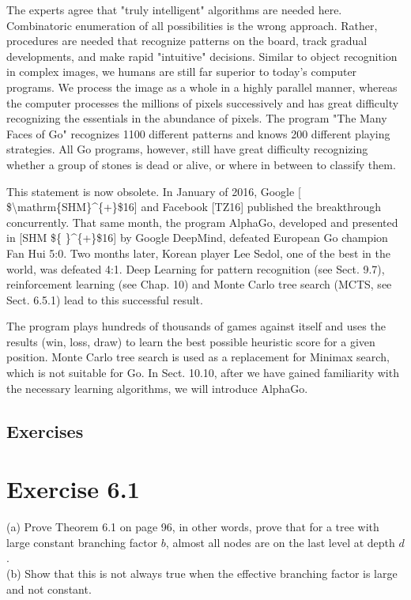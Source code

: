 \documentclass[10pt]{article}
\begin{document}
\begin{displayquote}
The experts agree that "truly intelligent" algorithms are needed here. Combinatoric enumeration of all possibilities is the wrong approach. Rather, procedures are needed that recognize patterns on the board, track gradual developments, and make rapid "intuitive" decisions. Similar to object recognition in complex images, we humans are still far superior to today's computer programs. We process the image as a whole in a highly parallel manner, whereas the computer processes the millions of pixels successively and has great difficulty recognizing the essentials in the abundance of pixels. The program "The Many Faces of Go" recognizes 1100 different patterns and knows 200 different playing strategies. All Go programs, however, still have great difficulty recognizing whether a group of stones is dead or alive, or where in between to classify them.
\end{displayquote}

This statement is now obsolete. In January of 2016, Google [ \$\textbackslash mathrm\{SHM\}\^{}\{+\}\$16] and Facebook [TZ16] published the breakthrough concurrently. That same month, the program AlphaGo, developed and presented in [SHM \$\{ \}\^{}\{+\}\$16] by Google DeepMind, defeated European Go champion Fan Hui 5:0. Two months later, Korean player Lee Sedol, one of the best in the world, was defeated 4:1. Deep Learning for pattern recognition (see Sect. 9.7), reinforcement learning (see Chap. 10) and Monte Carlo tree search (MCTS, see Sect. 6.5.1) lead to this successful result.

The program plays hundreds of thousands of games against itself and uses the results (win, loss, draw) to learn the best possible heuristic score for a given position. Monte Carlo tree search is used as a replacement for Minimax search, which is not suitable for Go. In Sect. 10.10, after we have gained familiarity with the necessary learning algorithms, we will introduce AlphaGo.

\subsection*{Exercises}
\section*{Exercise 6.1}
(a) Prove Theorem 6.1 on page 96, in other words, prove that for a tree with large constant branching factor $b$, almost all nodes are on the last level at depth $d$.\\
(b) Show that this is not always true when the effective branching factor is large and not constant.
\end{document}
